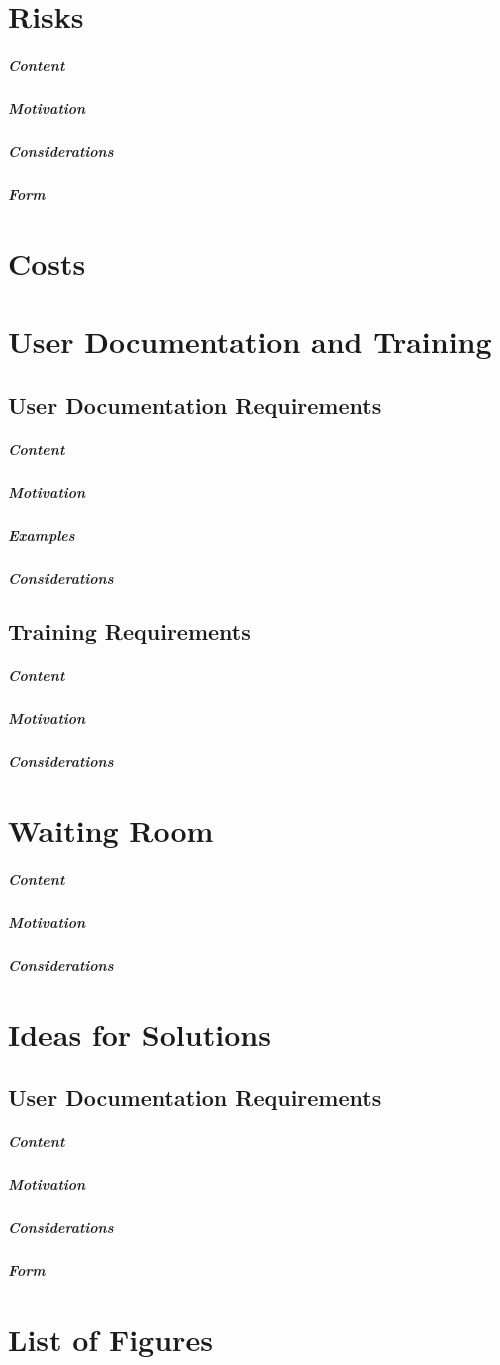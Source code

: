 \documentclass{article}
\begin{document}
\section{Risks}

\subparagraph{Content}
\subparagraph{Motivation}
\subparagraph{Considerations}
\subparagraph{Form}

\section{Costs}

\section{User Documentation and Training}

\subsection{User Documentation Requirements}
\subparagraph{Content}
\subparagraph{Motivation}
\subparagraph{Examples}
\subparagraph{Considerations}

\subsection{Training Requirements}
\subparagraph{Content}
\subparagraph{Motivation}
\subparagraph{Considerations}

\section{Waiting Room}

\subparagraph{Content}
\subparagraph{Motivation}
\subparagraph{Considerations}

\section{Ideas for Solutions}

\subsection{User Documentation Requirements}
\subparagraph{Content}
\subparagraph{Motivation}
\subparagraph{Considerations}
\subparagraph{Form}

\section*{List of Figures}
\end{document}
